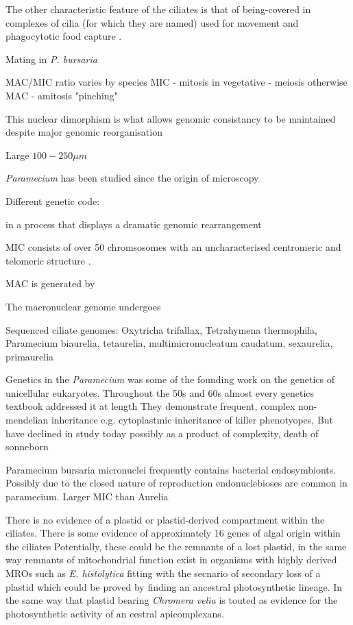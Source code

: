 The other characteristic feature of the ciliates is that of being-covered in complexes of cilia (for which they are named) 
used for movement and phagocytotic food capture \citep{Prescott1994}.


Mating in \textit{P. bursaria} 









MAC/MIC ratio varies by species %
MIC - mitosis in vegetative - meiosis otherwise
MAC - amitosis "pinching"

This nuclear dimorphism is what allows genomic consistancy to be maintained despite major genomic reorganisation

Large \(100-250\mu m\) 


\textit{Paramecium} has been studied since the origin of microscopy \citep{Gortz2009}


Different genetic code:


in a process that displays
a dramatic genomic rearrangement

MIC consists of over 50 chromsosomes with an uncharacterised centromeric and telomeric structure \citep{Aury2006}.

MAC is generated by 



The macronuclear genome undergoes 




Sequenced ciliate genomes: Oxytricha trifallax, Tetrahymena thermophila, Paramecium biaurelia, tetaurelia, multimicronucleatum
caudatum, sexaurelia, primaurelia



Genetics in the \textit{Paramecium} was some of the founding work on the genetics of unicellular eukaryotes.
Throughout the 50s and 60s almost every genetics textbook addressed it at length 
They demonstrate frequent, complex non-mendelian inheritance e.g. cytoplastmic inheritance of killer phenotyopes, 
But have declined in study today possibly as a product of complexity, death of sonneborn \citep{Preer1997}


Paramecium bursaria micronuclei frequently contains bacterial endosymbionts.  Possibly due to the closed
nature of reproduction endonuclebioses are common in paramecium.  Larger MIC than Aurelia \citep{Gortz2009}



There is no evidence of a plastid or plastid-derived compartment within the ciliates.
There is some evidence of approximately 16 genes of algal origin within the ciliates 
Potentially, these could be the remnants of a lost plastid, in the same way remnants of mitochondrial function 
exist in organisms with highly derived MROs such as \textit{E. histolytica} fitting with the secnario of
secondary loss of a plastid which could be proved by finding an ancestral photosynthetic lineage.
In the same way that plastid bearing \textit{Chromera velia} is touted as evidence for the photosynthetic activity
of an cestral apicomplexans. \citep{Reyes-Prieto2008}



